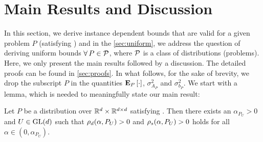 \section{Main Results and Discussion}\label{sec:mainresults}
In this section, we derive instance dependent bounds that are valid for a given problem $P$ (satisfying ) and in the \cref{sec:uniform}, we address the question of deriving uniform bounds $\forall\,P\in \P$, where $\P$ is a class of distributions (problems). Here, we only present the main results followed by a discussion. The detailed proofs can be found in \cref{sec:proofs}. 
In what follows, for the sake of brevity, we drop the subscript $P$ in the quantities $\EEP{\cdot}$, $\sigma^2_{A_P}$ and $\sigma^2_{b_P}$. 
We start with a lemma, which is needed to meaningfully state our main result:
\begin{lemma}\label{lm:hur}
Let $P$ be a distribution over $\R^d\times \R^{\dcd}$ satisfying . 
Then there exists an $\alpha_{P_U}>0$ and $U\in \gln$ such that $\rhod{P_U}>0$ and $\rhos{P_U}>0$
holds for all $\alpha \in (0,\alpha_{P_U})$. 
\end{lemma}
\begin{comment}
\begin{proof}
\begin{align*}
\rhos{P}&=\inf_{x:\norm{x}=1}x^* (A_P+A_P^*)x -\alpha x^*\EE{A_t^* A_t} x\\
&=\inf_{x:\norm{x}=1}x^* (A_P+A_P^*)x -\alpha x^* A^*_P A_P -\alpha x^* \EE{M_t^* M_t} x\\
&\geq \lambda_{\min}(A^*_P+A_P)-\alpha \norm{A_P}^2-\sigma^2_P
\end{align*}
The proof is complete by choosing $\alpha_P<\frac{\lambda_{\min}(A^*_P+A_P)}{\norm{A_P}^2+\sigma^2_P}$
\end{proof}
\end{comment}


